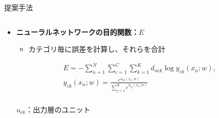 \documentclass[unicode,10pt]{beamer}
\newlength{\mycolumnwidth}
\newcommand{\itemtitle}[1]{\textbf{#1}\\}
\newcommand{\doublecolumns}[4]{
    \begin{minipage}[t]{#1}
      #2
    \end{minipage}
    \begin{minipage}[t]{#3}
      #4
    \end{minipage}}
\begin{document}
\begin{frame}[t]
\begin{block}{提案手法}
\begin{columns}[onlytextwidth,t]
\begin{column}{\mycolumnwidth}
\begin{itemize}
        \item \itemtitle{ニューラルネットワークの目的関数：$E$}
            \begin{itemize}
              \item カテゴリ毎に誤差を計算し、それらを合計
            \end{itemize}
          \doublecolumns{0.6\linewidth}{
            \vspace{-1.5em} %
            \begin{gather*}
              E = - \sum^{N}_{n = 1} \sum^{C}_{c = 1} \sum^{K}_{k = 1}
                    d_{nck} \log{y_{ck}(x_n; w)},
              \label{eq:NNObjective} \\
              y_{ck}(x_n; w) = \frac{e^{u_{ck}(x_n; w)}}
                                    {\sum^{K}_{j = 1} e^{u_{cj}(x_n; w)}}%
              \nonumber \\
            \end{gather*}
          }{0.375\linewidth}{
            \small
            $u_{ck}$：出力層のユニット \\
}
\end{itemize}
\end{column}
\end{columns}
\end{block}
\end{frame}
\end{document}
